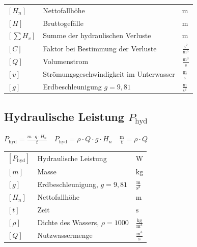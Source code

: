 \renewcommand{\arraystretch}{1.2}
\begin{tabular}{@{} l p{6cm} l @{}}
    $[H_n]$       & Nettofallhöhe \dotfill & m \\
    $[H]$         & Bruttogefälle \dotfill & m \\
    $\left[\sum H_v\right]$ & Summe der hydraulischen Verluste \dotfill & m \\
    $[C]$         & Faktor bei Bestimmung der Verluste \dotfill & $\frac{\text{s}^{2}}{\text{m}^5}$ \\
    $[Q]$         & Volumenstrom \dotfill & $\frac{\text{m}^3}{\text{s}}$ \\
    $[v]$         & Strömungsgeschwindigkeit im Unterwasser \dotfill & $\frac{\text{m}}{\text{s}}$ \\
    $[g]$         & Erdbeschleunigung $g = 9{,}81$ \dotfill & $\frac{\text{m}}{\text{s}^2}$ \\
\end{tabular}



\subsection{Hydraulische Leistung $P_{\text{hyd}}$}

$
\boxed{P_{\text{hyd}} = \frac{m \cdot g \cdot H_n}{t} }
\quad
\boxed{P_{\text{hyd}} = \rho \cdot Q \cdot g \cdot H_n}
\quad
\boxed{\frac{\text{m}}{\text{t}} = \rho \cdot Q}
$

\vspace{0.15cm}

\renewcommand{\arraystretch}{1.2}
\begin{tabular}{@{} l p{6cm} l @{}}
    $[P_{\text{hyd}}]$  & Hydraulische Leistung \dotfill                & $\text{W}$ \\
    $[m]$               & Masse \dotfill                                & $\text{kg}$ \\
    $[g]$               & Erdbeschleunigung, $g = 9{,}81$ \dotfill      & $\frac{\text{m}}{\text{s}^2}$ \\
    $[H_n]$             & Nettofallhöhe \dotfill                        & $\text{m}$ \\
    $[t]$               & Zeit \dotfill                                & $\text{s}$ \\
    $[\rho]$            & Dichte des Wassers, $\rho = 1000$ \dotfill    & $\frac{\text{kg}}{\text{m}^3}$ \\
    $[Q]$               & Nutzwassermenge \dotfill                      & $\frac{\text{m}^3}{\text{s}}$\\ 
\end{tabular}



